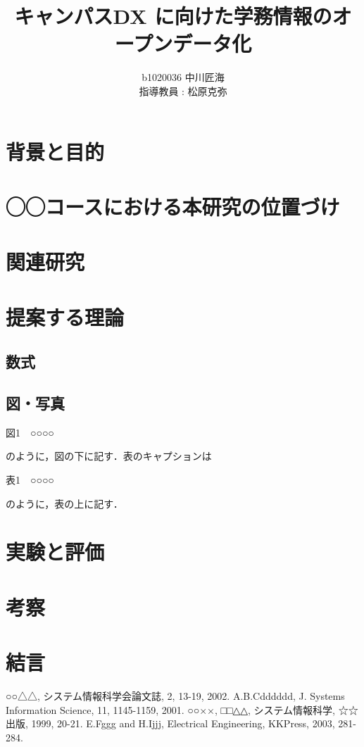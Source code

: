 \documentclass[11pt]{ujarticle}
\author{%
b1020036 中川匠海\\指導教員 : 松原克弥
}
\title{キャンパスDX に向けた学務情報のオープンデータ化}
\begin{document}
\maketitle

\section{背景と目的}



\section{◯◯コースにおける本研究の位置づけ}


\section{関連研究}


\section{提案する理論}

\subsection{数式}


\subsection{図・写真}


\begin{center}図1　○○○○\end{center}

のように，図の下に記す．表のキャプションは

\begin{center}表1　○○○○\end{center}

のように，表の上に記す．

\section{実験と評価}

\section{考察}

\section{結言}

\begin{thebibliography}{99}
	○○△△, システム情報科学会論文誌, 2, 13-19, 2002.
	A.B.Cdddddd, J. Systems Information Science, 11, 1145-1159, 2001.
	○○××, □□△△, システム情報科学, ☆☆出版, 1999, 20-21.
	E.Fggg and H.Ijjj, Electrical Engineering, KKPress, 2003, 281-284.
\end{thebibliography}
\end{document}
